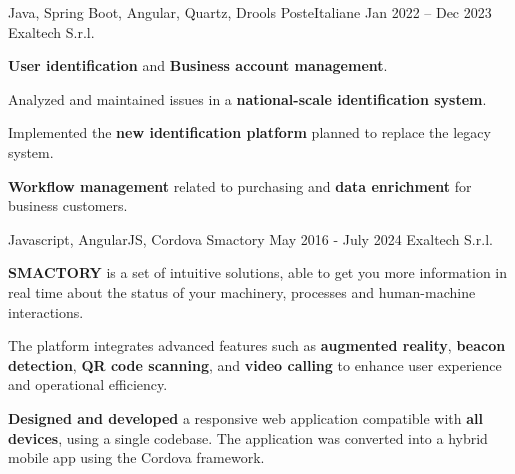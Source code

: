   \cventry
    {Java, Spring Boot, Angular, Quartz, Drools} %
    {PosteItaliane} %
    {Jan 2022 – Dec 2023} %
    {Exaltech S.r.l.} %
    {
      \begin{cvitems} %
        \item {\textbf{User identification} and \textbf{Business account management}.}
        \item {Analyzed and maintained issues in a \textbf{national-scale identification system}.}
        \item {Implemented the \textbf{new identification platform} planned to replace the legacy system.}  
        \item {\textbf{Workflow management} related to purchasing and \textbf{data enrichment} for business customers.}  
      \end{cvitems}
    }

  \cventry
    {Javascript, AngularJS, Cordova} %
    {Smactory} %
    {May 2016 - July 2024} %
    {Exaltech S.r.l.} %
    {
      \begin{cvitems} %
        \item {\textbf{SMACTORY} is a set of intuitive solutions, able to get you more information in real time about the status of your machinery, processes and human-machine interactions.}
        \item {The platform integrates advanced features such as \textbf{augmented reality}, \textbf{beacon detection}, \textbf{QR code scanning}, and \textbf{video calling} to enhance user experience and operational efficiency.}  
        \item {\textbf{Designed and developed} a responsive web application compatible with \textbf{all devices}, using a single codebase. The application was converted into a hybrid mobile app using the Cordova framework.}  
      \end{cvitems}
    }